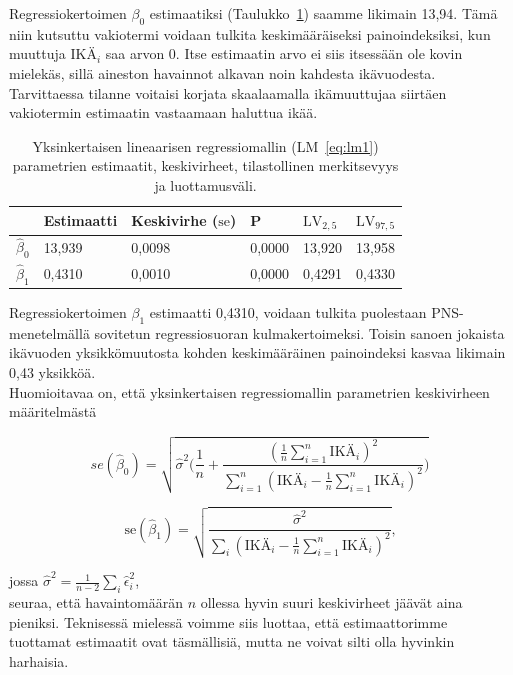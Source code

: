 \documentclass[finnish]{docopts}
\begin{document}
Regressiokertoimen $\beta_0$ estimaatiksi (Taulukko~\ref{table:lm1}) saamme likimain 13,94. Tämä niin kutsuttu vakiotermi voidaan tulkita keskimääräiseksi painoindeksiksi, kun muuttuja $\text{IKÄ}_i$ saa arvon 0. Itse estimaatin arvo ei siis itsessään ole kovin mielekäs, sillä aineston havainnot alkavan noin kahdesta ikävuodesta. Tarvittaessa tilanne voitaisi korjata skaalaamalla ikämuuttujaa siirtäen vakiotermin estimaatin vastaamaan haluttua ikää.\\

\begin{table}[H]
\centering
\begin{tabular}{llllll}
\toprule
  & Estimaatti & Keskivirhe ($\text{se}$) & P & $\text{LV}_{2,5}$ & $\text{LV}_{97,5}$\\
\midrule
$\hat{\beta}_0$ & 13,939 & 0,0098 & 0,0000 & 13,920 & 13,958\\
$\hat{\beta}_1$ & 0,4310 & 0,0010 & 0,0000 & 0,4291 & 0,4330\\
\bottomrule
\end{tabular}
\caption{Yksinkertaisen lineaarisen regressiomallin (LM~\ref{eq:lm1}) parametrien estimaatit, keskivirheet, tilastollinen merkitsevyys ja luottamusväli.}
\label{table:lm1}
\end{table}

Regressiokertoimen $\beta_1$ estimaatti 0,4310, voidaan tulkita puolestaan PNS-menetelmällä sovitetun regressiosuoran kulmakertoimeksi. Toisin sanoen jokaista ikävuoden yksikkömuutosta kohden keskimääräinen painoindeksi kasvaa likimain 0,43 yksikköä.\\

Huomioitavaa on, että yksinkertaisen regressiomallin parametrien keskivirheen määritelmästä

$$
se(\hat{\beta}_0)= \sqrt{\hat{\sigma}^2 \Bigg( \frac{1}{n}+\frac{( \frac{1}{n}\sum\limits_{i = 1}^{n}\text{IKÄ}_i)^2}{\sum_{i=1}^n (\text{IKÄ}_i- \frac{1}{n}\sum\limits_{i = 1}^{n}\text{IKÄ}_i)^2} \Bigg)}\,\!
$$

$$
\text{se}(\hat{\beta}_1) = \sqrt{\frac{\hat{\sigma}^2}{\sum_i (\text{IKÄ}_i - \frac{1}{n}\sum\limits_{i = 1}^{n}\text{IKÄ}_i)^2}},
$$

jossa $\hat{\sigma}^2 = \frac{1}{n-2} \sum_i \hat{\epsilon}_i^2$,\\

seuraa, että havaintomäärän $n$ ollessa hyvin suuri keskivirheet jäävät aina pieniksi. Teknisessä mielessä voimme siis luottaa, että estimaattorimme tuottamat estimaatit ovat täsmällisiä, mutta ne voivat silti olla hyvinkin harhaisia.\\
\end{document}
